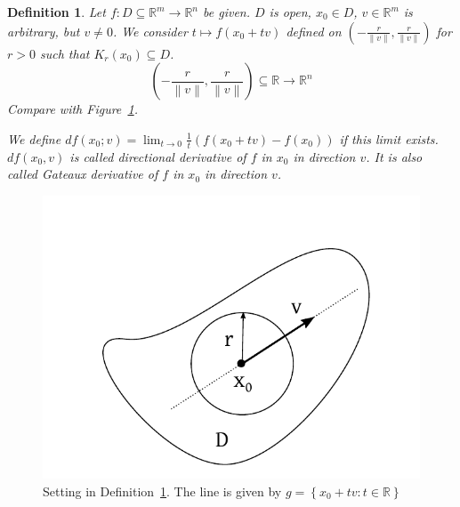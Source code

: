 \documentclass{article}
\newtheorem{definition}{Definition}  \numberwithin{definition}{section}
\newcommand{\set}[1]{\left\{#1\right\}}
\newcommand{\norm}[1]{\left\|#1\right\|}
\begin{document}
\begin{definition}
  \label{defin5}
  Let $f: D \subseteq \mathbb R^m \to \mathbb R^n$ be given.
  $D$ is open, $x_0 \in D$, $v \in \mathbb R^m$ is arbitrary, but $v \neq 0$.
  We consider $t \mapsto f(x_0 + tv)$ defined on $(-\frac{r}{\norm{v}}, \frac{r}{\norm{v}})$
  for $r > 0$ such that $K_r(x_0) \subseteq D$.
  \[ \left(-\frac{r}{\norm{v}}, \frac{r}{\norm{v}}\right) \subseteq \mathbb R \to \mathbb R^n \]
  Compare with Figure~\ref{img:set5}.

  We define $df(x_0; v) = \lim_{t \to 0} \frac1{t} (f(x_0 + tv) - f(x_0))$ if this limit exists. $df(x_0, v)$ is called \emph{directional derivative} of $f$ in $x_0$ in direction $v$. It is also called \emph{Gateaux derivative of $f$ in $x_0$ in direction $v$}.
\end{definition}

\begin{figure}[t]
  \begin{center}
    \includegraphics{img/31_setting.pdf}
    \caption{Setting in Definition~\ref{defin5}. The line is given by $g = \set{x_0 + tv: t \in \mathbb R}$}
    \label{img:set5}
  \end{center}
\end{figure}
\end{document}
